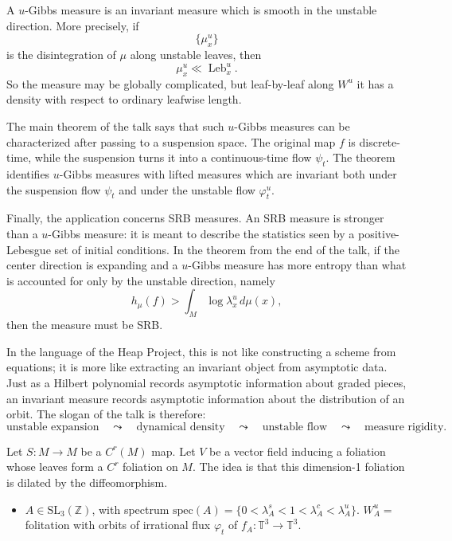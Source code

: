 \begin{remark}
\medskip\noindent
A $u$-Gibbs measure is an invariant measure
which is smooth in the unstable direction.
More precisely, if
$$
\{\mu_x^u\}
$$
is the disintegration of $\mu$ along unstable
leaves, then
$$
\mu_x^u\ll \operatorname{Leb}_x^u.
$$
So the measure may be globally complicated,
but leaf-by-leaf along $W^u$ it has a density
with respect to ordinary leafwise length.

\medskip\noindent
The main theorem of the talk says that such
$u$-Gibbs measures can be characterized after
passing to a suspension space. The original
map $f$ is discrete-time, while the suspension
turns it into a continuous-time flow
$\psi_t$. The theorem identifies $u$-Gibbs
measures with lifted measures which are
invariant both under the suspension flow
$\psi_t$ and under the unstable flow
$\varphi_t^u$.

\medskip\noindent
Finally, the application concerns SRB
measures. An SRB measure is stronger than a
$u$-Gibbs measure: it is meant to describe
the statistics seen by a positive-Lebesgue
set of initial conditions. In the theorem
from the end of the talk, if the center
direction is expanding and a $u$-Gibbs measure
has more entropy than what is accounted for
only by the unstable direction, namely
$$
h_\mu(f)>
\int_M \log \lambda_x^u\,d\mu(x),
$$
then the measure must be SRB.

\medskip\noindent
In the language of the Heap Project, this is
not like constructing a scheme from equations;
it is more like extracting an invariant
object from asymptotic data. Just as a Hilbert
polynomial records asymptotic information
about graded pieces, an invariant measure
records asymptotic information about the
distribution of an orbit. The slogan of the
talk is therefore:
$$
\text{unstable expansion}
\quad\leadsto\quad
\text{dynamical density}
\quad\leadsto\quad
\text{unstable flow}
\quad\leadsto\quad
\text{measure rigidity}.
$$
\end{remark}

\noindent
Let $S:M \to M$ be a $C^r(M)$ map.
Let $V$ be a vector field
inducing a foliation
whose leaves form a $C^r$ foliation
on $M$.
The idea is
that this dimension-1 
foliation is dilated by the
diffeomorphism.

\begin{example}
\label{example-sl3-spectrum}
\begin{itemize}
\item $A \in \text{SL}_3(\mathbb{Z})$,
with spectrum
$\text{spec}(A)
= \{0<\lambda_A^s<1<
\lambda^c_A
<\lambda^u_A\}$.
$W_A^u
= $ folitation with orbits
of irrational flux $\varphi_t$
of $f_A:\mathbb{T}^3 \to \mathbb{T}^3$.
\end{itemize}
\end{example}

